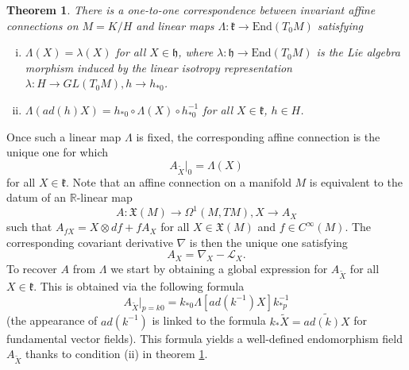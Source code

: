 \documentclass[a4paper,12pt,parskip=half*,chapterprefix=true,numbers=noendperiod]{scrreprt}
\newtheorem{theorem}{Theorem}[section]
\theoremstyle{definition}
\theoremstyle{remark}
\begin{document}
\begin{theorem}\label{thm:AffineWangAX}
 There is a one-to-one correspondence between invariant affine connections on $M=K/H$ and linear maps $\Lambda:\mathfrak{k}\to\text{End}(T_0M)$ satisfying
	\begin{enumerate}[(i)]
		\item $\Lambda(X)=\lambda(X)$ for all $X\in\mathfrak{h}$, where $\lambda:\mathfrak{h}\to\text{End}(T_0M)$ is the Lie algebra morphism induced by the linear isotropy representation $\lambda:H\to GL(T_0M),h\to h_{*0}$.
		\item $\Lambda(ad(h)X)=h_{*0}\circ \Lambda(X)\circ h^{-1}_{*0}$ for all $X\in\mathfrak{k}$, $h\in H$.
	\end{enumerate}
\end{theorem}

Once such a linear map $\Lambda$ is fixed, the corresponding affine connection is the unique one for which
\begin{equation*}
	A_{\tilde{X}}|_0=\Lambda(X)
\end{equation*}
for all $X\in\mathfrak{k}$. Note that an affine connection on a manifold $M$ is equivalent to the datum of an $\mathbb{R}$-linear map
\begin{equation*}
A:\mathfrak{X}(M)\to\Omega^1(M,TM),X\to A_X
\end{equation*}
such that $A_{fX}=X\otimes df+fA_X$ for all $X\in\mathfrak{X}(M)$ and $f\in C^{\infty}(M)$. The corresponding covariant derivative $\nabla$ is then the unique one satisfying
\begin{equation*}
A_X=\nabla_X-\mathcal{L}_X.
\end{equation*}
To recover $A$ from $\Lambda$ we start by obtaining a global expression for $A_{\tilde{X}}$ for all $X\in\mathfrak{k}$. This is obtained via the following formula
\begin{equation*}
	A_{\tilde{X}}|_{p=k0}=k_{*0}\Lambda[ad(k^{-1})X]k^{-1}_{*p}
\end{equation*}
(the appearance of $ad(k^{-1})$ is linked to the formula $k_*\tilde{X}=\widetilde{ad(k)X}$ for fundamental vector fields). This formula yields a well-defined endomorphism field $A_{\tilde{X}}$ thanks to condition (ii) in theorem \ref{thm:AffineWangAX}.
\end{document}

